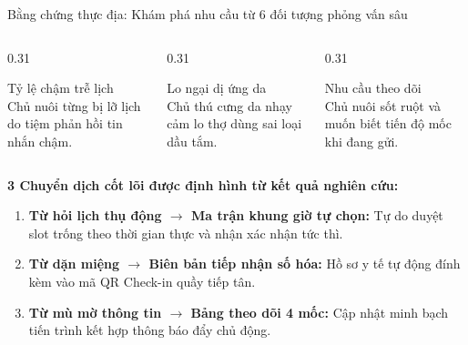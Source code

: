 \begin{frame}{Bằng chứng thực địa: Khám phá nhu cầu từ 6 đối tượng phỏng vấn sâu}
  \begin{columns}[T]
    \begin{column}{0.31\textwidth}
      \begin{block}{\centering Tỷ lệ chậm trễ lịch}
        \vskip 1mm
        \\
        \footnotesize Chủ nuôi từng bị lỡ lịch do tiệm phản hồi tin nhắn chậm.
        \vskip 1mm
      \end{block}
    \end{column}
    \begin{column}{0.31\textwidth}
      \begin{block}{\centering Lo ngại dị ứng da}
        \vskip 1mm
        \\
        \footnotesize Chủ thú cưng da nhạy cảm lo thợ dùng sai loại dầu tắm.
        \vskip 1mm
      \end{block}
    \end{column}
    \begin{column}{0.31\textwidth}
      \begin{block}{\centering Nhu cầu theo dõi}
        \vskip 1mm
        \\
        \footnotesize Chủ nuôi sốt ruột và muốn biết tiến độ mốc khi đang gửi.
        \vskip 1mm
      \end{block}
    \end{column}
  \end{columns}

  \vskip 3mm
  \textbf{3 Chuyển dịch cốt lõi được định hình từ kết quả nghiên cứu:}
  \begin{enumerate}
    \item \textbf{Từ hỏi lịch thụ động $\rightarrow$ Ma trận khung giờ tự chọn:} Tự do duyệt slot trống theo thời gian thực và nhận xác nhận tức thì.
    \item \textbf{Từ dặn miệng $\rightarrow$ Biên bản tiếp nhận số hóa:} Hồ sơ y tế tự động đính kèm vào mã QR Check-in quầy tiếp tân.
    \item \textbf{Từ mù mờ thông tin $\rightarrow$ Bảng theo dõi 4 mốc:} Cập nhật minh bạch tiến trình kết hợp thông báo đẩy chủ động.
  \end{enumerate}
\end{frame}

